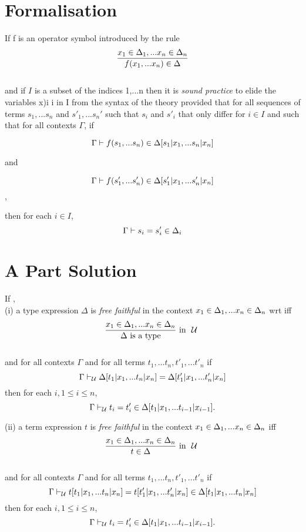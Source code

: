 \documentclass[10pt,a4paper,fleqn]{article}
\begin{document}
\section{Formalisation}
\begin{definition}
If f is an operator symbol introduced by the rule  \\
$$\frac{x_1 \in \Delta_1,... x_{n} \in \Delta_{n}}{f(x_1,...x_n) \in \Delta}$$ \\

and if $I$ is a subset of the indices {1,...n} then it is \textit{sound practice} to elide the variables x)i i in I from the syntax of the theory \gat provided that 
 for all sequences of terms $s_1,...s_n$ and
$s'_1,...s_n'$ such that $s_i$ and $s'_i$ that only differ for $i \in I$ and such that for all  contexts $\Gamma$, if 

$$\Gamma  \vdash f(s_1,...s_n) \in \Delta[s_1|x_1,...s_n|x_n]$$

and 

$$\Gamma  \vdash f(s'_1,...s'_n) \in \Delta[s'_1|x_1,...s'_n|x_n]$$,

then for each $i \in I$,
$$\Gamma  \vdash s_i = s'_i \in \Delta_i$$
\end{definition}



\section{A Part Solution}

\begin{definition}
If \isagat, \\

\noindent
(i)  a type expression $\Delta$ is \textit{free faithful} in the context $x_1 \in \Delta_1,... x_{n} \in \Delta_{n}$
wrt \gat iff 
$$\frac{\schmcon{x}{\Delta}{n}}{\isT{\Delta}} \mbox{ in \gat} $$ \\
\noindent 
and for all contexts $\Gamma$ and for all terms $t_1,...t_n, t'_1,...t'_n$ if \\
$$\Gamma  \vdash_{\mathcal{U}} \Delta[t_1|x_1,...t_n|x_n]=\Delta[t'_1|x_1,...t'_n|x_n]$$
then for each $i, 1 \leq i \leq n$,
$$\Gamma  \vdash_{\mathcal{U}} t_i = t'_i \in  \Delta[t_1|x_1,...t_{i-1}|x_{i-1}].$$

\noindent
(ii) a term expression $t$ is \textit{free faithful} in the context $x_1 \in \Delta_1,... x_{n} \in \Delta_{n}$ iff 
$$\frac{\schmcon{x}{\Delta}{n}}{\ofT{t}{\Delta}} \mbox{ in \gat} $$ \\
\noindent 
and for all contexts $\Gamma$ and for all terms $t_1,...t_n, t'_1,...t'_n$ if \\
$$\Gamma  \vdash_{\mathcal{U}} t[t_1|x_1,...t_n|x_n]=t[t'_1|x_1,...t'_n|x_n] \in \Delta[t_1|x_1,...t_n|x_n]  $$
then for each $i, 1 \leq i \leq n$,
$$\Gamma  \vdash_{\mathcal{U}} t_i = t'_i \in  \Delta[t_1|x_1,...t_{i-1}|x_{i-1}].$$

\end{definition}
\end{document}
